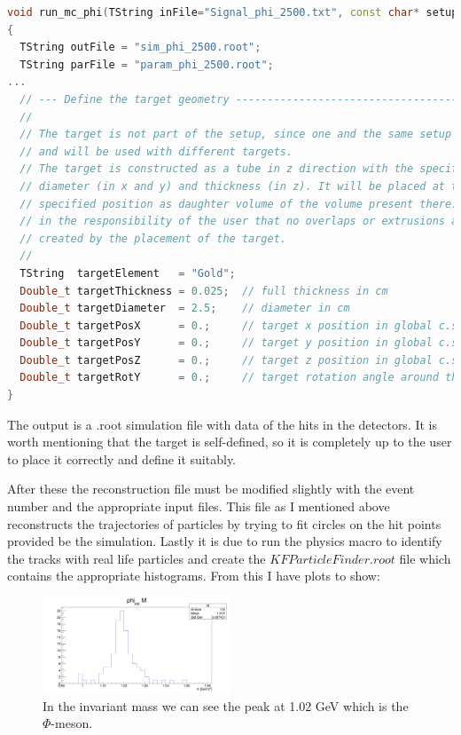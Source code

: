 \documentclass[a4paper,12pt]{article}
\begin{document}
\begin{lstlisting}[language=C++]
void run_mc_phi(TString inFile="Signal_phi_2500.txt", const char* setupName = "sis100_electron", Int_t nEvents = 2500)
{
  TString outFile = "sim_phi_2500.root";
  TString parFile = "param_phi_2500.root";
...
  // --- Define the target geometry -----------------------------------------
  //
  // The target is not part of the setup, since one and the same setup can
  // and will be used with different targets.
  // The target is constructed as a tube in z direction with the specified
  // diameter (in x and y) and thickness (in z). It will be placed at the
  // specified position as daughter volume of the volume present there. It is
  // in the responsibility of the user that no overlaps or extrusions are
  // created by the placement of the target.
  //
  TString  targetElement   = "Gold";
  Double_t targetThickness = 0.025;  // full thickness in cm
  Double_t targetDiameter  = 2.5;    // diameter in cm
  Double_t targetPosX      = 0.;     // target x position in global c.s. [cm]
  Double_t targetPosY      = 0.;     // target y position in global c.s. [cm]
  Double_t targetPosZ      = 0.;     // target z position in global c.s. [cm]
  Double_t targetRotY      = 0.;     // target rotation angle around the y axis [deg]
}
\end{lstlisting} 
\par The output is a .root simulation file with data of the hits in the detectors. It is worth mentioning
 that the target is self-defined, so it is completely up to the user to place it correctly and define it suitably.
\vspace{5mm}
\par After these the reconstruction file must be modified slightly with the event number and the appropriate
 input files. This file as I mentioned above reconstructs the trajectories of particles by trying to fit circles
  on the hit points provided be the simulation. Lastly it is due to run the physics macro to identify the tracks 
  with real life particles and create the $KFParticleFinder.root$ file which contains the appropriate histograms. 
  From this I have plots to show:
\begin{figure}[H]
	\centering
	\includegraphics[width=0.5\textwidth]{phiKK_2500phi.png}
	\caption{ In the invariant mass we can see the peak at 1.02 GeV which is the $\Phi$-meson. }
\end{figure}
\end{document}
